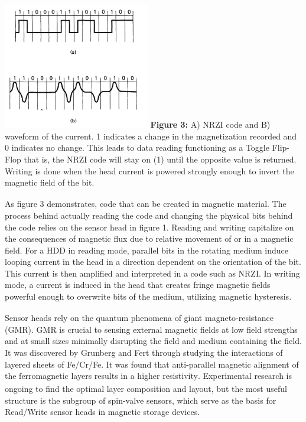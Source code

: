\documentclass[11pt]{article}
\begin{document}
\begin{multicols}{2}
\begin{center}
	\centering
	\includegraphics[width=0.48\textwidth]{Waveform_code.png}
	{\footnotesize\textbf{Figure 3:}  A) NRZI code and B) waveform of the current. 1 indicates a change in the magnetization recorded and 0 indicates no change. This leads to data reading functioning as a Toggle Flip-Flop that is, the NRZI code will stay on (1) until the opposite value is returned. Writing is done when the head current is powered strongly enough to invert the magnetic field of the bit\textsubscript{\cite{label1}}}.
\end{center} 

As figure 3 demonstrates, code that can be created in magnetic material. The process behind actually reading the code and changing the physical bits behind the code relies on the sensor head in figure 1. Reading and writing capitalize on the consequences of magnetic flux due to relative movement of or in a magnetic field. For a HDD in reading mode, parallel bits in the rotating medium induce looping current in the head in a direction dependent on the orientation of the bit. This current is then amplified and interpreted in a code such as NRZI. In writing mode, a current is induced in the head that creates fringe magnetic fields powerful enough to overwrite bits of the medium, utilizing magnetic hysteresis\textsubscript{\cite{label1}}.

Sensor heads rely on the quantum phenomena of giant magneto-resistance (GMR). GMR is crucial to sensing external magnetic fields at low field strengths and at small sizes minimally disrupting the field and medium containing the field. It was discovered by Grunberg and Fert through studying the interactions of layered sheets of Fe/Cr/Fe. It was found that anti-parallel magnetic alignment of the ferromagnetic layers results in a higher resistivity\textsubscript{\cite{label5}}. Experimental research is ongoing to find the optimal layer composition and layout, but the most useful structure is the subgroup of spin-valve sensors, which serve as the basis for Read/Write sensor heads in magnetic storage devices\textsubscript{\cite{label4}}.


\end{multicols}
\end{document}
